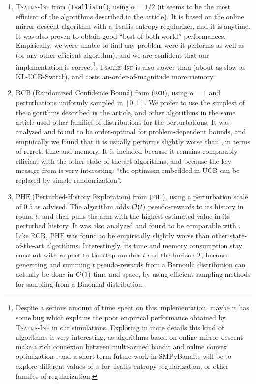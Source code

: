 \begin{enumerate}
    \item
    \textsc{Tsallis-Inf} from \cite{Zimmert2018} (\texttt{TsallisInf}), using $\alpha=1/2$ (it seems to be the most efficient of the algorithms described in the article).
    It is based on the online mirror descent algorithm with a Tsallis entropy regularizer, and it is anytime.
    It was also proven to obtain good ``best of both world'' performances.
    Empirically, we were unable to find any problem were it performs as well as \UCB{} (or any other efficient algorithm), and we are confident that our implementation is correct\footnote{Despite a serious amount of time spent on this implementation, maybe it has some bug which explains the poor empirical performance obtained by \textsc{Tsallis-Inf} in our simulations. Exploring in more details this kind of algorithms is very interesting, as algorithms based on online mirror descent make a rich connexion between multi-armed bandit and online convex optimization \cite{Hazan2016introduction}, and a short-term future work in SMPyBandits will be to explore different values of $\alpha$ for Tsallis entropy regularization, or other families of regularization.}.
    \textsc{Tsallis-Inf} is also slower than \UCB{} (about as slow as KL-UCB-Switch), and costs an-order-of-magnitude more memory.

    \item
    $\mathrm{RCB}$ (Randomized Confidence Bound) from \cite{KimTewari2019} (\texttt{RCB}), using $\alpha=1$ and perturbations uniformly sampled in $[0,1]$. We prefer to use the simplest of the algorithms described in the article, and other algorithms in the same article used other families of distributions for the perturbations.
    It was analyzed and found to be order-optimal for problem-dependent bounds, and empirically we found that it is usually performs slightly worse than \UCB, in terms of regret, time and memory.
    It is included because it remains comparably efficient with the other state-of-the-art algorithms, and because the key message from \cite{KimTewari2019} is very interesting:
    ``the optimism embedded in UCB can be replaced by simple randomization''.

    \item
    $\mathrm{PHE}$ (Perturbed-History Exploration) from \cite{KvetonSzepesvari2019} (\texttt{PHE}), using a perturbation scale of $0.5$ as advised.
    The algorithm adds $\mathcal{O}(t)$ \iid{} pseudo-rewards to its history in round $t$, and then pulls the arm with the highest estimated value in its perturbed history.
    It was also analyzed and found to be comparable with \UCB.
    Like $\mathrm{RCB}$, $\mathrm{PHE}$ was found to be empirically slightly worse than other state-of-the-art algorithms.
    Interestingly, its time and memory consumption stay constant with respect to the step number $t$ and the horizon $T$, because generating and summing $t$ pseudo-rewards from a Bernoulli distribution can actually be done in $\mathcal{O}(1)$ time and space, by using efficient sampling methods for sampling from a Binomial distribution.
\end{enumerate}


